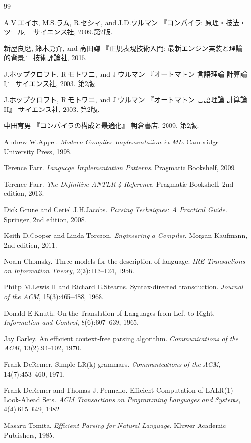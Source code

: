 \begin{thebibliography}{99}
    \item A.V.エイホ, M.S.ラム, R.セシィ, and J.D.ウルマン 『コンパイラ: 原理・技法・ツール』 サイエンス社, 2009.第2版.
    \item 新屋良磨, 鈴木勇介, and 高田謙 『正規表現技術入門: 最新エンジン実装と理論的背景』 技術評論社, 2015.
    \item J.ホップクロフト, R.モトワニ, and J.ウルマン 『オートマトン 言語理論 計算論 I』 サイエンス社, 2003. 第2版.
    \item J.ホップクロフト, R.モトワニ, and J.ウルマン 『オートマトン 言語理論 計算論 II』 サイエンス社, 2003. 第2版.
    \item 中田育男 『コンパイラの構成と最適化』 朝倉書店, 2009. 第2版.
    \item Andrew W.Appel. \textit{Modern Compiler Implementation in ML}. Cambridge University Press, 1998.
    \item Terence Parr. \textit{Language Implementation Patterns}. Pragmatic Bookshelf, 2009.
    \item Terence Parr. \textit{The Definitive ANTLR 4 Reference}. Pragmatic Bookshelf, 2nd edition, 2013.
    \item Dick Grune and Ceriel J.H.Jacobs. \textit{Parsing Techniques: A Practical Guide}. Springer, 2nd edition, 2008.
    \item Keith D.Cooper and Linda Torczon. \textit{Engineering a Compiler}. Morgan Kaufmann, 2nd edition, 2011.
    \item Noam Chomsky. Three models for the description of language. \textit{IRE Transactions on Information Theory}, 2(3):113–124, 1956.
    \item Philip M.Lewis II and Richard E.Stearns. Syntax-directed transduction. \textit{Journal of the ACM}, 15(3):465–488, 1968.
    \item Donald E.Knuth. On the Translation of Languages from Left to Right. \textit{Information and Control}, 8(6):607–639, 1965.
    \item Jay Earley. An efficient context-free parsing algorithm. \textit{Communications of the ACM}, 13(2):94–102, 1970.
    \item Frank DeRemer. Simple LR(k) grammars. \textit{Communications of the ACM}, 14(7):453–460, 1971.
    \item Frank DeRemer and Thomas J. Pennello. Efficient Computation of LALR(1) Look-Ahead Sets. \textit{ACM Transactions on Programming Languages and Systems}, 4(4):615–649, 1982.
    \item Masaru Tomita. \textit{Efficient Parsing for Natural Language}. Kluwer Academic Publishers, 1985.

\end{thebibliography}
